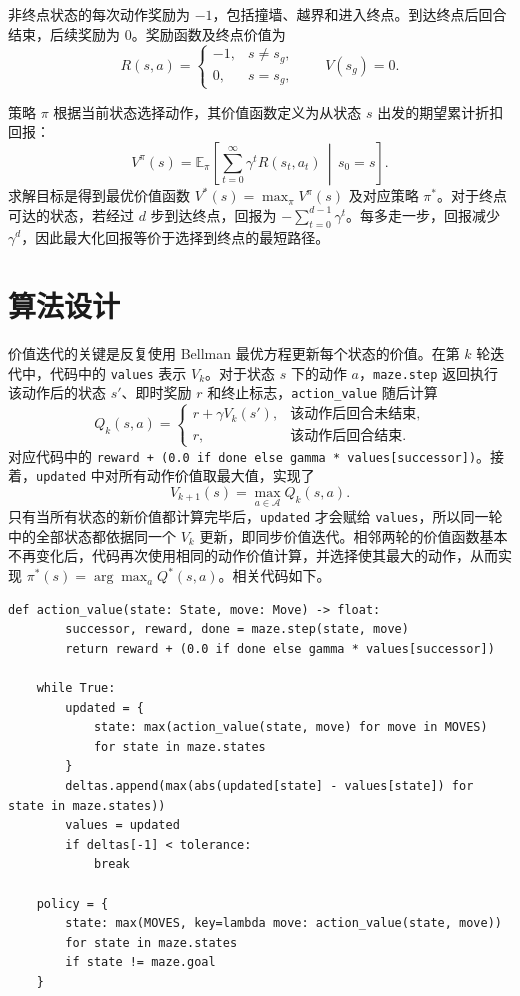 \documentclass[12pt,a4paper,fontset=none]{ctexart}
\begin{document}
非终点状态的每次动作奖励为 $-1$，包括撞墙、越界和进入终点。到达终点后回合结束，后续奖励为 $0$。奖励函数及终点价值为
\[
R(s,a)=
\begin{cases}
-1, & s\ne s_g,\\
0, & s=s_g,
\end{cases}
\qquad V(s_g)=0.
\]

策略 $\pi$ 根据当前状态选择动作，其价值函数定义为从状态 $s$ 出发的期望累计折扣回报：
\[
V^\pi(s)=\mathbb{E}_\pi\!\left[
\sum_{t=0}^{\infty}\gamma^t R(s_t,a_t)\,\middle|\,s_0=s
\right].
\]
求解目标是得到最优价值函数 $V^*(s)=\max_\pi V^\pi(s)$ 及对应策略 $\pi^*$。对于终点可达的状态，若经过 $d$ 步到达终点，回报为 $-\sum_{t=0}^{d-1}\gamma^t$。每多走一步，回报减少 $\gamma^d$，因此最大化回报等价于选择到终点的最短路径。

\section{算法设计}

价值迭代的关键是反复使用 Bellman 最优方程更新每个状态的价值。在第 $k$ 轮迭代中，代码中的 \texttt{values} 表示 $V_k$。对于状态 $s$ 下的动作 $a$，\texttt{maze.step} 返回执行该动作后的状态 $s'$、即时奖励 $r$ 和终止标志，\texttt{action\_value} 随后计算
\[
Q_k(s,a)=
\begin{cases}
r+\gamma V_k(s'), & \text{该动作后回合未结束},\\
r, & \text{该动作后回合结束}.
\end{cases}
\]
对应代码中的 \texttt{reward + (0.0 if done else gamma * values[successor])}。接着，\texttt{updated} 中对所有动作价值取最大值，实现了
\[
V_{k+1}(s)=\max_{a\in\mathcal{A}}Q_k(s,a).
\]
只有当所有状态的新价值都计算完毕后，\texttt{updated} 才会赋给 \texttt{values}，所以同一轮中的全部状态都依据同一个 $V_k$ 更新，即同步价值迭代。相邻两轮的价值函数基本不再变化后，代码再次使用相同的动作价值计算，并选择使其最大的动作，从而实现 $\pi^*(s)=\arg\max_a Q^*(s,a)$。相关代码如下。

\begin{lstlisting}[style=pythonstyle,caption={Bellman 最优更新与策略提取},label={lst:value-iteration}]
    def action_value(state: State, move: Move) -> float:
        successor, reward, done = maze.step(state, move)
        return reward + (0.0 if done else gamma * values[successor])

    while True:
        updated = {
            state: max(action_value(state, move) for move in MOVES)
            for state in maze.states
        }
        deltas.append(max(abs(updated[state] - values[state]) for state in maze.states))
        values = updated
        if deltas[-1] < tolerance:
            break

    policy = {
        state: max(MOVES, key=lambda move: action_value(state, move))
        for state in maze.states
        if state != maze.goal
    }
\end{lstlisting}
\end{document}
